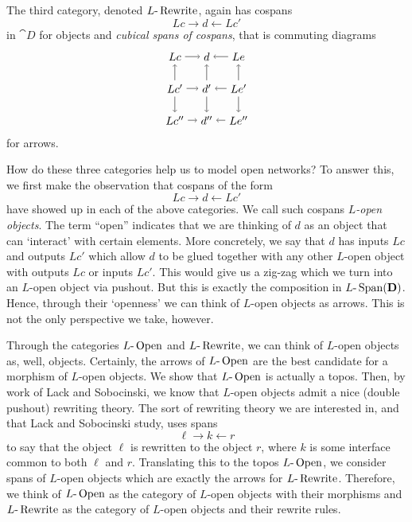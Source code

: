 The third category, denoted
	$ L \text{-} \operatorname{Rewrite} $,
again has cospans 
\[
	Lc \to d \gets Lc'
\]
in $ \cat{D} $ for objects and
\emph{cubical spans of cospans}, that is
commuting diagrams 
\[ %
\begin{tikzpicture}
	\node (Lc) at (-1,1) {$ Lc $};
	\node (Lc') at (-1,0) {$ Lc' $};
	\node (Lc'') at (-1,-1) {$ Lc'' $};
	\node (d) at (0,1) {$ d $};
	\node (d') at (0,0) {$ d' $};
	\node (d'') at (0,-1) {$ d'' $};
	\node (Le) at (1,1) {$ Le $};
	\node (Le') at (1,0) {$ Le' $};
	\node (Le'') at (1,-1) {$ Le'' $};
	\draw [->] (Lc) to (d);
	\draw [->] (Le) to (d);
	\draw [->] (Lc') to (d');
	\draw [->] (Le') to (d');
	\draw [->] (Lc'') to (d'');
	\draw [->] (Le'') to (d'');
	\draw [->] (Lc') to (Lc);
	\draw [->] (Lc') to (Lc'');
	\draw [->] (d') to (d);
	\draw [->] (d') to (d'');
	\draw [->] (Le') to (Le);
	\draw [->] (Le') to (Le'');
\end{tikzpicture}
\]
for arrows.  

How do these three categories help
us to model open networks?
To answer this, we first make the
observation that cospans of the form
\[
	Lc \to d \gets Lc'
\]
have showed up in each of the above
categories. We call such cospans
\emph{$L$-open objects}.  The term ``open''
indicates that we are thinking of $d$ as 
an object that can `interact' with certain 
elements. More concretely, we say that $ d $ 
has inputs $Lc$ and outputs $ Lc' $ which allow
$ d $ to be glued together with any other
$ L $-open object with outputs $ Lc $ or 
inputs $ Lc' $.  This would give us a zig-zag
which we turn into an $ L $-open object
via pushout.  But this is exactly the composition
in $ L \text{-} \operatorname{Span} ( \mathbf{D} ) $. Hence, through their `openness' 
we can think of $ L $-open objects as arrows.
This is not the only perspective we take, however.

Through the categories $ L \text{-} \operatorname{Open} $ and $ L \text{-} \operatorname{Rewrite} $,
we can think of $ L $-open objects as, well, objects.
Certainly, the arrows of $ L \text{-} \operatorname{Open} $ are the best
candidate for a morphism of $ L $-open objects.  
We show that $ L \text{-} \operatorname{Open} $ is actually a topos.
Then, by work of Lack and Sobocinski, we know that
$ L $-open objects admit a nice (double pushout)
rewriting theory. The sort of rewriting theory we are
interested in, and that Lack and Sobocinski study,
uses spans 
\[
	\ell \to k \gets r
\]
to say that the object $ \ell $ is
rewritten to the object $ r $, where $ k $
is some interface common to both 
$ \ell $ and $ r $.  Translating this to the topos 
$ L \text{-} \operatorname{Open} $, we consider spans of $ L $-open objects
which are exactly the arrows for $ L \text{-} \operatorname{Rewrite} $.
Therefore, we think of $ L \text{-} \operatorname{Open} $ as the
category of $ L $-open objects with their
morphisms and $ L \text{-} \operatorname{Rewrite} $ as the category
of $ L $-open objects and their rewrite rules.  

 






